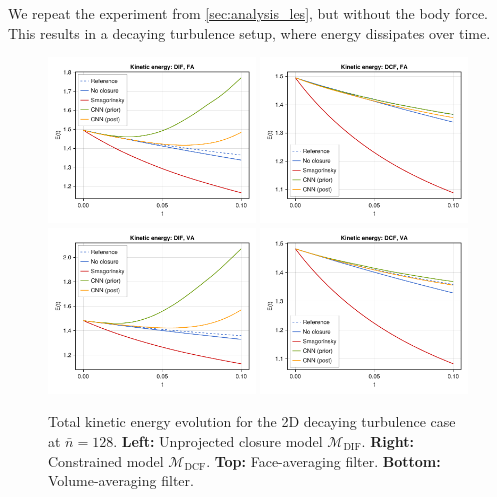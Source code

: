 \documentclass[preprint]{elsarticle}
\begin{document}
We repeat the experiment from \ref{sec:analysis_les}, but without the body
force. This results in a decaying turbulence setup, where energy dissipates over
time. 

\begin{figure}
    \centering
    \includegraphics[width=0.49\textwidth]{figures_energy_evolution_rimbaud_iorder1_ifilter1_igrid2.pdf}
    \includegraphics[width=0.49\textwidth]{figures_energy_evolution_rimbaud_iorder2_ifilter1_igrid2.pdf}
    \includegraphics[width=0.49\textwidth]{figures_energy_evolution_rimbaud_iorder1_ifilter2_igrid2.pdf}
    \includegraphics[width=0.49\textwidth]{figures_energy_evolution_rimbaud_iorder2_ifilter2_igrid2.pdf}
    \caption{Total kinetic energy evolution for
        the 2D decaying turbulence case at
        $\bar{n} = 128$.
        \textbf{Left:} Unprojected closure model $\mathcal{M}_{\text{DIF}}$.
        \textbf{Right:} Constrained model $\mathcal{M}_{\text{DCF}}$.
        \textbf{Top:} Face-averaging filter.
        \textbf{Bottom:} Volume-averaging filter.
    }
    \label{fig:energy_evolution_decaying}
\end{figure}
\end{document}
